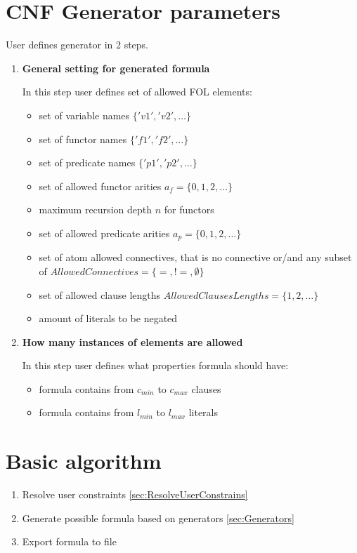 \section{CNF Generator parameters}

User defines generator in 2 steps.
\begin{enumerate}
  \item \textbf{General setting for generated formula}

    In this step user defines set of allowed \gls{FOL} elements:
    \begin{itemize}
      \item set of variable names $\{'v1','v2',\dots\}$
      \item set of functor names $\{'f1','f2',\dots\}$
      \item set of predicate names $\{'p1','p2',\dots\}$
      \item set of allowed functor arities $a_f = \{0, 1, 2,\dots\}$
      \item maximum recursion depth $n$ for functors
      \item set of allowed predicate arities $a_p = \{0, 1, 2,\dots\}$
      \item set of atom allowed connectives, that is no connective or/and any subset of $AllowedConnectives = \{=, !=, \emptyset\}$
      \item set of allowed clause lengths $AllowedClausesLengths = \{1,2,\dots\}$
      \item amount of literals to be negated
    \end{itemize}

  \item \textbf{How many instances of elements are allowed}

    In this step user defines what properties formula should have:
    \begin{itemize}
      \item formula contains from $c_{min}$ to $c_{max}$ clauses
      \item formula contains from $l_{min}$ to $l_{max}$ literals
    \end{itemize}

\end{enumerate}

\section{Basic algorithm}

\begin{enumerate}
  \item Resolve user constraints \ref{sec:ResolveUserConstrains}
  \item Generate possible formula based on generators \ref{sec:Generators}
  \item Export formula to file
\end{enumerate}

